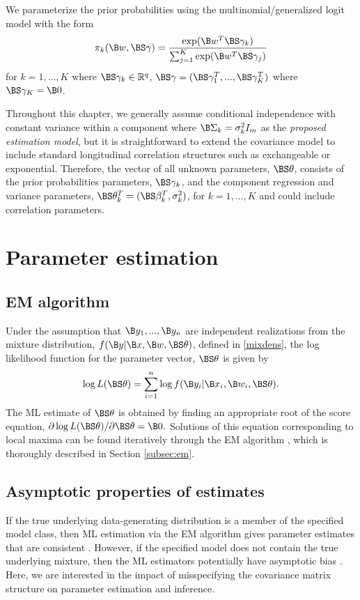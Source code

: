 We parameterize the prior probabilities using the multinomial/generalized logit model with the form
$$\pi_{k}(\B w,\BS\gamma)=\frac{\exp(\B w^{T}\BS\gamma_{k})}{\sum_{j=1}^{K}\exp(\B w^{T}\BS\gamma_{j})}$$ 
for $k=1,...,K$ where $\BS \gamma_{k}\in\mathbb{R}^{q}$, $\BS\gamma = (\BS\gamma_1^T,...,\BS\gamma_K^T)$ where $\BS\gamma_{K}=\B 0$.

Throughout this chapter, we generally assume conditional independence with constant variance within a component where $\B\Sigma_{k}=\sigma^{2}_{k}I_{m}$ as the {\em proposed estimation model}, but it is straightforward to extend the covariance model to include standard longitudinal correlation structures such as exchangeable or exponential. Therefore, the vector of all unknown parameters, $\BS\theta$, consists of the prior probabilities parameters, $\BS\gamma_{k}$, and the component regression and variance parameters, $\BS\theta^{T}_{k}=(\BS\beta^{T}_{k},\sigma^{2}_{k})$, for $k=1,...,K$ and could include correlation parameters.  

\section{Parameter estimation}\label{chp2:est}
\subsection{EM algorithm}
Under the assumption that $\B y_{1},...,\B y_{n}$ are independent realizations from the mixture distribution, $f(\B y | \B x, \B w, \BS\theta)$, defined in \ref{mixdens}, the log likelihood function for the parameter vector, $\BS \theta$ is given by
$$\log L(\BS\theta)=\sum^{n}_{i=1}\log f(\B y_{i}|\B x_{i},\B w_{i},\BS \theta).$$
The ML estimate of $\BS\theta$ is obtained by finding an appropriate root of the score equation, $\partial \log L(\BS\theta)/\partial \BS\theta=\B 0.$
Solutions of this equation corresponding to local maxima can be found iteratively through the EM algorithm \cite{dempster1977}, which is thoroughly described in Section \ref{subsec:em}. 

\subsection{Asymptotic properties of estimates}
If the true underlying data-generating distribution is a member of the specified model class, then ML estimation via the EM algorithm gives parameter estimates that are consistent  \cite{wald1949, lecam1953}. However, if the specified model does not contain the true underlying mixture, then the ML estimators potentially have asymptotic bias \cite{gray1994,lo2011}. Here, we are interested in the impact of misspecifying the covariance matrix structure on parameter estimation and inference.


